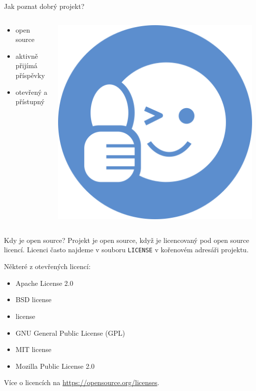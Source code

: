 \documentclass[11pt]{beamer}
\begin{document}
\begin{frame}{Jak poznat dobrý projekt?}
		\begin{columns}[T]
		\begin{column}{0.5\textwidth}
		\begin{itemize}
		\item open source
		\item aktivně přijímá příspěvky
		\item otevřený a přístupný
		\end{itemize}
		\end{column}
		\begin{column}{0.5\textwidth}
			\includegraphics[width=\textwidth]{images/good.png}
		\end{column}
	\end{columns}

\end{frame}

\begin{frame}{Kdy je open source?}
	Projekt je open source, když je licencovaný pod open source licencí. Licenci často najdeme v souboru \texttt{LICENSE} v kořenovém adresáři projektu.
	
	Některé z otevřených licencí:
	
	\begin{itemize}
		\item  Apache License 2.0
		\item  BSD  license
		\item  {} license
		\item  GNU General Public License (GPL)
		\item  MIT license
		\item Mozilla Public License 2.0
	\end{itemize}

Více o licencích na \url{https://opensource.org/licenses}.
\end{frame}
\end{document}
